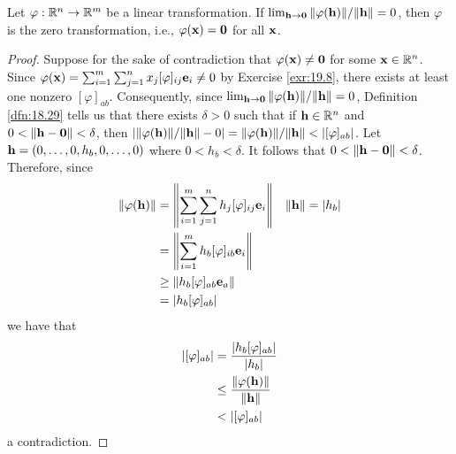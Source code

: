 \documentclass[../main.tex]{subfiles}
\begin{document}
\begin{lemma}\label{lem:19.13}
    Let $\varphi:\mathbb{R}^n\to\mathbb{R}^m$ be a linear transformation. If $\lim_{\mathbf{h}\to\mathbf{0}}\norm{\varphi(\mathbf{h})}/\norm{\mathbf{h}}=0$, then $\varphi$ is the zero transformation, i.e., $\varphi(\mathbf{x})=\mathbf{0}$ for all $\mathbf{x}$.
    \begin{proof}
        Suppose for the sake of contradiction that $\varphi(\mathbf{x})\neq\mathbf{0}$ for some $\mathbf{x}\in\mathbb{R}^n$. Since $\varphi(\mathbf{x})=\sum_{i=1}^m\sum_{j=1}^nx_j[\varphi]_{ij}\mathbf{e}_i\neq 0$ by Exercise \ref{exr:19.8}, there exists at least one nonzero $[\varphi]_{ab}$. Consequently, since $\lim_{\mathbf{h}\to\mathbf{0}}\norm{\varphi(\mathbf{h})}/\norm{\mathbf{h}}=0$, Definition \ref{dfn:18.29} tells us that there exists $\delta>0$ such that if $\mathbf{h}\in\mathbb{R}^n$ and $0<\norm{\mathbf{h}-\mathbf{0}}<\delta$, then $|\norm{\varphi(\h)}/\norm{\h}-0|=\norm{\varphi(\h)}/\norm{\h}<|[\varphi]_{ab}|$. Let $\mathbf{h}=(0,\dots,0,h_b,0,\dots,0)$ where $0<h_b<\delta$. It follows that $0<\norm{\mathbf{h}-\mathbf{0}}<\delta$. Therefore, since
        \begin{align*}
            \norm{\varphi(\mathbf{h})} &= \norm{\sum_{i=1}^m\sum_{j=1}^nh_j[\varphi]_{ij}\mathbf{e}_i}&
                \norm{\mathbf{h}} &= |h_b|\\
            &= \norm{\sum_{i=1}^mh_b[\varphi]_{ib}\mathbf{e}_i}\\
            &\geq \norm{h_b[\varphi]_{ab}\mathbf{e}_a}\\
            &= |h_b[\varphi]_{ab}|
        \end{align*}
        we have that
        \begin{align*}
            |[\varphi]_{ab}| &= \frac{|h_b[\varphi]_{ab}|}{|h_b|}\\
            &\leq \frac{\norm{\varphi(\mathbf{h})}}{\norm{\mathbf{h}}}\\
            &< |[\varphi]_{ab}|
        \end{align*}
        a contradiction.
    \end{proof}
\end{lemma}
\end{document}
